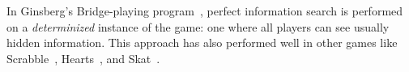 \documentclass[letterpaper]{article}
\newcounter{vlNoteCounter}
\newcommand{\vlnote}[1]{{\scriptsize \color{blue} $\blacksquare$ \refstepcounter{vlNoteCounter}\textsf{[VL]$_{\arabic{vlNoteCounter}}$:{#1}}}}
\begin{document}


In Ginsberg's Bridge-playing program~\cite{Ginsberg96Partition,Ginsberg01}, perfect information search is 
performed on a {\it determinized} instance of the game: one where all players can see usually hidden information. 
This approach has also performed well in other games like Scrabble~\cite{Sheppard02World}, 
Hearts~\cite{Sturtevant08An}, and Skat~\cite{Buro09Improving}. 
\end{document}
